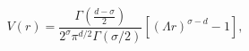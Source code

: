 \begin{equation}
\label{potential}
V(r)=\frac{\Gamma\left(\frac{d-\sigma}{2}\right)}{
2^\sigma\pi^{d/2}\Gamma(\sigma/2)}[(\Lambda r)^{\sigma-d}-1],
\end{equation}

